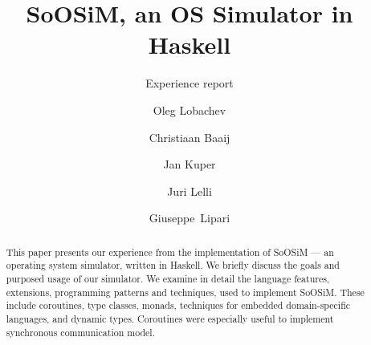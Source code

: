 \documentclass{llncs}
\newcommand{\soosim}{SoOSiM\xspace}
\begin{document}
\title{\soosim, an OS Simulator in Haskell}
\subtitle{Experience report}


\author{Oleg Lobachev \and Christiaan Baaij \and Jan
  Kuper \and Juri Lelli \and Giuseppe~Lipari} 



\maketitle



\begin{abstract}
This paper presents our experience from the implementation of \soosim{} --- an operating system simulator, written in Haskell.
We briefly discuss the goals and purposed usage of our simulator.
We examine in detail the language features, extensions, programming patterns and techniques, used to implement \soosim.
These include coroutines, type classes, monads, techniques for embedded domain-specific languages, and dynamic types.
Coroutines were especially useful to implement synchronous communication model.
\end{abstract}



\end{document}
